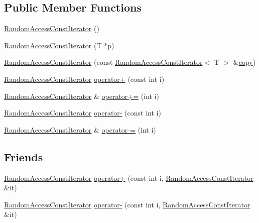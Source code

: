 \subsection*{Public Member Functions}
\begin{DoxyCompactItemize}
\item 
\hyperlink{classprism_1_1_random_access_const_iterator_a5e3fcf144f52339d93d15af4f11a58b4}{Random\+Access\+Const\+Iterator} ()
\item 
\hyperlink{classprism_1_1_random_access_const_iterator_a96024a7e89fb7d2696d0f5a0af4166bf}{Random\+Access\+Const\+Iterator} (T $\ast$\hyperlink{classprism_1_1_forward_const_iterator_ad4e0c824b923c399c6ee381a03e66df2}{p})
\item 
\hyperlink{classprism_1_1_random_access_const_iterator_a529c55043fba2589869eec66c8bbe032}{Random\+Access\+Const\+Iterator} (const \hyperlink{classprism_1_1_random_access_const_iterator}{Random\+Access\+Const\+Iterator}$<$ T $>$ \&\hyperlink{namespaceprism_ae776f4cd825f79e7af1cf6ee1d90a209}{copy})
\item 
\hyperlink{classprism_1_1_random_access_const_iterator}{Random\+Access\+Const\+Iterator} \hyperlink{classprism_1_1_random_access_const_iterator_a94bdce83df081d5e3de4c647a4a73b8f}{operator+} (const int i)
\item 
\hyperlink{classprism_1_1_random_access_const_iterator}{Random\+Access\+Const\+Iterator} \& \hyperlink{classprism_1_1_random_access_const_iterator_a468befebae8eb10b525ce2a32d36e3d0}{operator+=} (int i)
\item 
\hyperlink{classprism_1_1_random_access_const_iterator}{Random\+Access\+Const\+Iterator} \hyperlink{classprism_1_1_random_access_const_iterator_a5cd99e5ee4693d9669a9f17de7710935}{operator-\/} (const int i)
\item 
\hyperlink{classprism_1_1_random_access_const_iterator}{Random\+Access\+Const\+Iterator} \& \hyperlink{classprism_1_1_random_access_const_iterator_a4dc3f50f2ab7e1916ae595f78b86062a}{operator-\/=} (int i)
\end{DoxyCompactItemize}
\subsection*{Friends}
\begin{DoxyCompactItemize}
\item 
\hyperlink{classprism_1_1_random_access_const_iterator}{Random\+Access\+Const\+Iterator} \hyperlink{classprism_1_1_random_access_const_iterator_a6bff6ca7fb4bbb4122adc5077b52415d}{operator+} (const int i, \hyperlink{classprism_1_1_random_access_const_iterator}{Random\+Access\+Const\+Iterator} \&it)
\item 
\hyperlink{classprism_1_1_random_access_const_iterator}{Random\+Access\+Const\+Iterator} \hyperlink{classprism_1_1_random_access_const_iterator_a99577c4e83e9b20e01230b8fb377215a}{operator-\/} (const int i, \hyperlink{classprism_1_1_random_access_const_iterator}{Random\+Access\+Const\+Iterator} \&it)
\end{DoxyCompactItemize}

